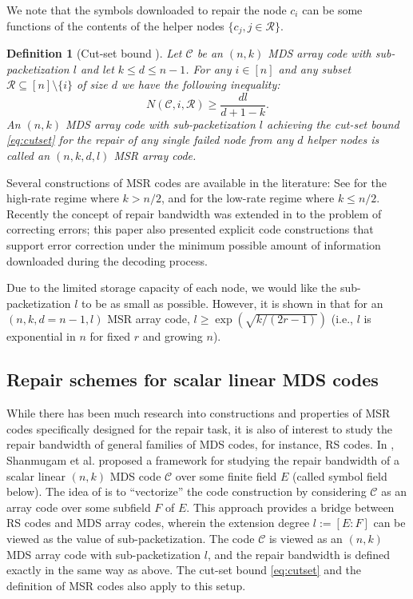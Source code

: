 \documentclass[11pt,onecolumn]{IEEEtran}
\newtheorem{definition}{Definition}
\newcommand{\cC}{\mathcal{C}}
\newcommand{\cR}{\mathcal{R}}
\begin{document}
We note that the symbols downloaded to repair the node $c_i$ can be some functions of the contents  of the helper
nodes $\{c_j,j\in \cR\}.$

\begin{definition}[Cut-set bound \cite{Dimakis10}] \label{def:csb}
Let $\cC$ be an $(n,k)$ MDS array code with sub-packetization $l$ and let $k\leq d \leq n-1$.
For any $i\in[n]$ and any subset
$\cR\subseteq[n]\setminus\{i\}$ of size $d$ we have the following inequality:
\begin{equation}\label{eq:cutset}
N(\cC,i,\cR)\ge \frac{dl}{d+1-k}.
\end{equation}
 An $(n,k)$ MDS array code with sub-packetization $l$ achieving the cut-set bound \eqref{eq:cutset} for the repair of any single failed node from any $d$ helper nodes is called an $(n,k,d,l)$ {\em MSR array code}. 
 \end{definition}
 

Several constructions of MSR codes are available in the literature: See 
\cite{Ye16,Ye16a,Goparaju17,Raviv17,Tamo13} for the high-rate regime where $k>n/2$, and \cite{Rashmi11} for the low-rate regime where $k
\le n/2$. Recently the concept of repair bandwidth was extended in \cite{Tamo17} to the problem of correcting errors; this paper also
presented explicit code constructions that support error correction under the minimum possible amount of information downloaded during
the decoding process.


 Due to the limited storage capacity of each node, we would like the sub-packetization $l$ to be as small as possible. However, it is shown in \cite{Goparaju14} that for an $(n,k,d=n-1,l)$ MSR array code,  $l\ge \exp({\sqrt{k/(2r-1)}})$  (i.e., $l$ is exponential in $n$ for fixed $r$ and growing $n$). 
 
 \subsection{Repair schemes for scalar linear MDS codes}
While there has been much research into constructions and properties of MSR codes specifically designed for the repair task, it is
also of interest to study the repair bandwidth of general families of MDS codes, for instance, RS codes.
In \cite{Shanmugam14}, Shanmugam et al. proposed a framework for studying the repair bandwidth of a scalar linear $(n,k)$ MDS code $\cC$ 
over some finite field $E$ (called symbol field below). The idea of \cite{Shanmugam14} is to ``vectorize'' the code construction by considering $\cC$ 
as an array code over some subfield $F$ of $E$. This approach provides a bridge between RS codes and MDS array codes, wherein 
the extension degree $l:=[E:F]$ can be viewed as the value of sub-packetization. The code $\cC$ is viewed as an $(n,k)$ MDS array code with sub-packetization $l$, and the repair bandwidth is
defined exactly in the same way as above. The cut-set bound \eqref{eq:cutset} {and the definition of MSR codes} also apply to this setup.
\end{document}
